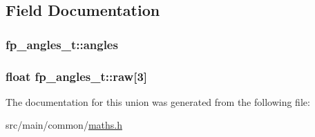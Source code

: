 \subsection{Field Documentation}
\hypertarget{unionfp__angles__t_a4207a1efb367370e211ae35bc5a40d27}{
\subsubsection[{angles}]{ fp\+\_\+angles\+\_\+t\+::angles}}\label{unionfp__angles__t_a4207a1efb367370e211ae35bc5a40d27}
\hypertarget{unionfp__angles__t_a32ef06c827de340b48a6446899283295}{
\subsubsection[{raw}]{\setlength{\rightskip}{0pt plus 5cm}float fp\+\_\+angles\+\_\+t\+::raw\mbox{[}3\mbox{]}}}\label{unionfp__angles__t_a32ef06c827de340b48a6446899283295}


The documentation for this union was generated from the following file\+:\begin{DoxyCompactItemize}
\item 
src/main/common/\hyperlink{maths_8h}{maths.\+h}\end{DoxyCompactItemize}
